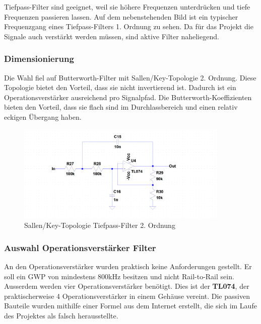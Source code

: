 Tiefpass-Filter sind geeignet, weil sie höhere Frequenzen unterdrücken und tiefe Frequenzen passieren lassen. Auf dem nebenstehenden Bild ist ein typischer Frequenzgang eines Tiefpass-Filters 1. Ordnung zu sehen. Da für das Projekt die Signale auch verstärkt werden müssen, sind aktive Filter naheliegend.\cite{ant}


\subsubsection*{Dimensionierung}

Die Wahl fiel auf Butterworth-Filter mit Sallen/Key-Topologie 2. Ordnung. Diese Topologie bietet den Vorteil, dass sie nicht invertierend ist. Dadurch ist ein Operationsverstärker ausreichend pro Signalpfad. Die Butterworth-Koeffizienten bieten den Vorteil, dass sie flach sind im Durchlassbereich und einen relativ eckigen Übergang haben.\cite{wiki}



\begin{figure}[H]
\begin{center}
\includegraphics[width=0.9\textwidth]{images/Analoge_Schaltung_Sallen.png}
\caption{Sallen/Key-Topologie Tiefpass-Filter 2. Ordnung}
\end{center}
\end{figure}


\subsubsection*{Auswahl Operationsverstärker Filter}
An den Operationsverstärker wurden praktisch keine Anforderungen gestellt. Er soll ein GWP\cite{wiki} von mindestens 800kHz besitzen und nicht Rail-to-Rail sein. Ausserdem werden vier Operationsverstärker benötigt. Dies ist der \textbf{TL074}, der praktischerweise 4 Operationsverstärker in einem Gehäuse vereint. Die passiven Bauteile wurden mithilfe einer Formel\cite{fail} aus dem Internet erstellt, die sich im Laufe des Projektes als falsch herausstellte.

